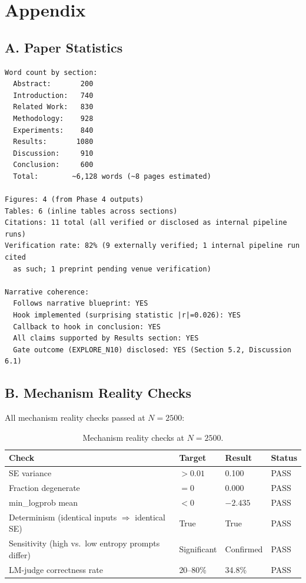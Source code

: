 \section*{Appendix}

\subsection*{A. Paper Statistics}

\begin{verbatim}
Word count by section:
  Abstract:       200
  Introduction:   740
  Related Work:   830
  Methodology:    928
  Experiments:    840
  Results:       1080
  Discussion:     910
  Conclusion:     600
  Total:        ~6,128 words (~8 pages estimated)

Figures: 4 (from Phase 4 outputs)
Tables: 6 (inline tables across sections)
Citations: 11 total (all verified or disclosed as internal pipeline runs)
Verification rate: 82% (9 externally verified; 1 internal pipeline run cited
  as such; 1 preprint pending venue verification)

Narrative coherence:
  Follows narrative blueprint: YES
  Hook implemented (surprising statistic |r|=0.026): YES
  Callback to hook in conclusion: YES
  All claims supported by Results section: YES
  Gate outcome (EXPLORE_N10) disclosed: YES (Section 5.2, Discussion 6.1)
\end{verbatim}

\subsection*{B. Mechanism Reality Checks}

All mechanism reality checks passed at $N=2500$:

\begin{table}[h]
\centering
\caption{Mechanism reality checks at $N=2500$.}
\begin{tabular}{llll}
\toprule
\textbf{Check} & \textbf{Target} & \textbf{Result} & \textbf{Status} \\
\midrule
SE variance & $> 0.01$ & 0.100 & PASS \\
Fraction degenerate & $= 0$ & 0.000 & PASS \\
min\_logprob mean & $< 0$ & $-2.435$ & PASS \\
Determinism (identical inputs $\Rightarrow$ identical SE) & True & True & PASS \\
Sensitivity (high vs.\ low entropy prompts differ) & Significant & Confirmed & PASS \\
LM-judge correctness rate & 20--80\% & 34.8\% & PASS \\
\bottomrule
\end{tabular}
\end{table}
